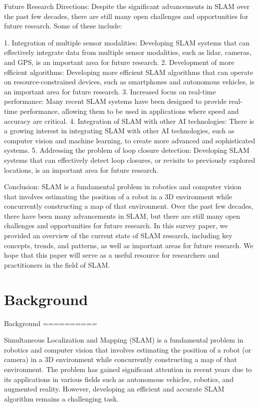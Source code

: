 \documentclass[conference]{IEEEtran}
\begin{document}
Future Research Directions:
Despite the significant advancements in SLAM over the past few decades, there are still many open challenges and opportunities for future research. Some of these include:

1. Integration of multiple sensor modalities: Developing SLAM systems that can effectively integrate data from multiple sensor modalities, such as lidar, cameras, and GPS, is an important area for future research.
2. Development of more efficient algorithms: Developing more efficient SLAM algorithms that can operate on resource-constrained devices, such as smartphones and autonomous vehicles, is an important area for future research.
3. Increased focus on real-time performance: Many recent SLAM systems have been designed to provide real-time performance, allowing them to be used in applications where speed and accuracy are critical.
4. Integration of SLAM with other AI technologies: There is a growing interest in integrating SLAM with other AI technologies, such as computer vision and machine learning, to create more advanced and sophisticated systems.
5. Addressing the problem of loop closure detection: Developing SLAM systems that can effectively detect loop closures, or revisits to previously explored locations, is an important area for future research.

Conclusion:
SLAM is a fundamental problem in robotics and computer vision that involves estimating the position of a robot in a 3D environment while concurrently constructing a map of that environment. Over the past few decades, there have been many advancements in SLAM, but there are still many open challenges and opportunities for future research. In this survey paper, we provided an overview of the current state of SLAM research, including key concepts, trends, and patterns, as well as important areas for future research. We hope that this paper will serve as a useful resource for researchers and practitioners in the field of SLAM.

\section{Background}
Background
==========

Simultaneous Localization and Mapping (SLAM) is a fundamental problem in robotics and computer vision that involves estimating the position of a robot (or camera) in a 3D environment while concurrently constructing a map of that environment. The problem has gained significant attention in recent years due to its applications in various fields such as autonomous vehicles, robotics, and augmented reality. However, developing an efficient and accurate SLAM algorithm remains a challenging task.
\end{document}
